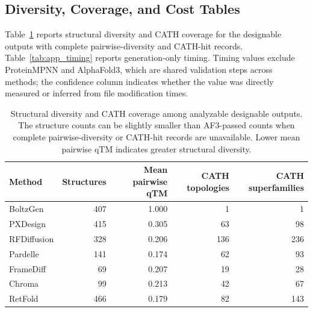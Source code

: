 \documentclass[letterpaper]{article} %
\begin{document}
\subsection{Diversity, Coverage, and Cost Tables}

Table~\ref{tab:app_diversity_coverage} reports structural diversity and CATH coverage for the designable outputs with complete pairwise-diversity and CATH-hit records. Table~\ref{tab:app_timing} reports generation-only timing. Timing values exclude ProteinMPNN and AlphaFold3, which are shared validation steps across methods; the confidence column indicates whether the value was directly measured or inferred from file modification times.

\begin{table}[t]
\centering
\small
\begin{tabular}{lrrrr}
\toprule
Method & Structures & Mean pairwise qTM & CATH topologies & CATH superfamilies \\
\midrule
BoltzGen & 407 & 1.000 & 1 & 1 \\
PXDesign & 415 & 0.305 & 63 & 98 \\
RFDiffusion & 328 & 0.206 & 136 & 236 \\
Pardelle & 141 & 0.174 & 62 & 93 \\
FrameDiff & 69 & 0.207 & 19 & 28 \\
Chroma & 99 & 0.213 & 42 & 67 \\
RetFold & 466 & 0.179 & 82 & 143 \\
\bottomrule
\end{tabular}
\caption{Structural diversity and CATH coverage among analyzable designable outputs. The structure counts can be slightly smaller than AF3-passed counts when complete pairwise-diversity or CATH-hit records are unavailable. Lower mean pairwise qTM indicates greater structural diversity.}
\label{tab:app_diversity_coverage}
\end{table}
\end{document}
